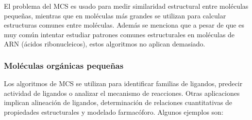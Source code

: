 El problema del MCS es usado para medir similaridad estructural entre moléculas pequeñas, mientras que en moléculas más grandes se utilizan para calcular estructuras comunes entre moléculas. Además se menciona que a pesar de que es muy común intentar estudiar patrones comunes estructurales en moléculas de ARN (ácidos ribonucleicos), estos algoritmos no aplican demasiado.

\subsubsection{Moléculas orgánicas pequeñas}

Los algoritmos de MCS se utilizan para identificar familias de ligandos, predecir actividad de ligandos o analizar el mecanismo de reacciones. Otras aplicaciones implican alineación de ligandos, determinación de relaciones cuantitativas de propiedades estructurales y modelado farmacóforo. Algunos ejemplos son:

